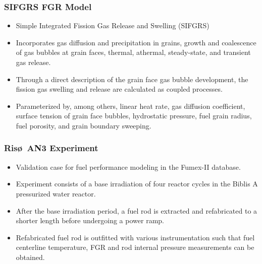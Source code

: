 \begin{frame}

\end{frame}
\begin{frame}
\frametitle{SIFGRS FGR Model}

\begin{itemize}
  \item Simple Integrated Fission Gas Release and Swelling (SIFGRS)
  \item Incorporates gas diffusion and precipitation in grains, growth and coalescence of gas bubbles at grain faces, thermal, athermal, steady-state, and transient gas release. 
  \item Through a direct description of the grain face gas bubble development, the fission gas swelling and release are calculated as coupled processes.
  \item Parameterized by, among others, linear heat rate, gas diffusion coefficient, surface tension of grain face bubbles, hydrostatic pressure, fuel grain radius, fuel porosity, and grain boundary sweeping. 
\end{itemize}

\end{frame}
\begin{frame}
\frametitle{Ris\o~AN3 Experiment}

\begin{itemize}
  \item Validation case for fuel performance modeling in the Fumex-II database.
  \item Experiment consists of a base irradiation of four reactor cycles in the Biblis A pressurized water reactor.
  \item After the base irradiation period, a fuel rod is extracted and refabricated to a shorter length before undergoing a power ramp.
  \item Refabricated fuel rod is outfitted with various instrumentation such that fuel centerline temperature, FGR and rod internal pressure measurements can be obtained.    
\end{itemize}

\end{frame}
